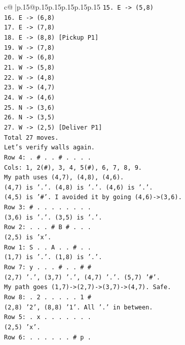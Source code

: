 \documentclass{article}
\begin{document}
{\begin{supertabular}{c@{$\;$}|p{.15\linewidth}@{}p{.15\linewidth}p{.15\linewidth}p{.15\linewidth}p{.15\linewidth}p{.15\linewidth}}
{{{\texttt{15. E {-}> (5,8)} \\
\texttt{16. E {-}> (6,8)} \\
\texttt{17. E {-}> (7,8)} \\
\texttt{18. E {-}> (8,8) {[}Pickup P1{]}} \\
\texttt{19. W {-}> (7,8)} \\
\texttt{20. W {-}> (6,8)} \\
\texttt{21. W {-}> (5,8)} \\
\texttt{22. W {-}> (4,8)} \\
\texttt{23. W {-}> (4,7)} \\
\texttt{24. W {-}> (4,6)} \\
\texttt{25. N {-}> (3,6)} \\
\texttt{26. N {-}> (3,5)} \\
\texttt{27. W {-}> (2,5) {[}Deliver P1{]}} \\
\texttt{Total 27 moves.} \\
\texttt{Let's verify walls again.} \\
\texttt{Row 4: . \# . . \# . . . .} \\
\texttt{Cols: 1, 2(\#), 3, 4, 5(\#), 6, 7, 8, 9.} \\
\texttt{My path uses (4,7), (4,8), (4,6).} \\
\texttt{(4,7) is '.'. (4,8) is '.'. (4,6) is '.'.} \\
\texttt{(4,5) is '\#'. I avoided it by going (4,6){-}>(3,6).} \\
\texttt{Row 3: \# . . . . . . . .} \\
\texttt{(3,6) is '.'. (3,5) is '.'.} \\
\texttt{Row 2: . . . \# B \# . . .} \\
\texttt{(2,5) is 'x'.} \\
\texttt{Row 1: S . . A . . \# . .} \\
\texttt{(1,7) is '.'. (1,8) is '.'.} \\
\texttt{Row 7: y . . . \# . . \# \#} \\
\texttt{(2,7) '.', (3,7) '.', (4,7) '.'. (5,7) '\#'.} \\
\texttt{My path goes (1,7){-}>(2,7){-}>(3,7){-}>(4,7). Safe.} \\
\texttt{Row 8: . 2 . . . . . 1 \#} \\
\texttt{(2,8) '2', (8,8) '1'. All '.' in between.} \\
\texttt{Row 5: . x . . . . . . .} \\
\texttt{(2,5) 'x'.} \\
\texttt{Row 6: . . . . . . \# p .} \\
}}}
\end{supertabular}}
\end{document}
